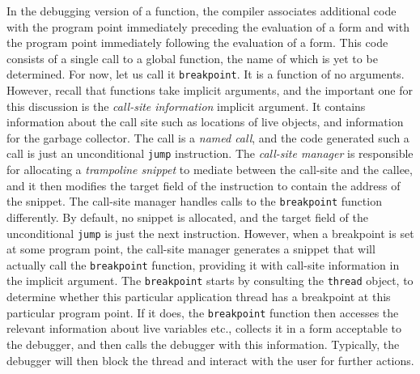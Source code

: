 In the debugging version of a function, the compiler associates
additional code with the program point immediately preceding the
evaluation of a form and with the program point immediately following
the evaluation of a form.  This code consists of a single call to a
global function, the name of which is yet to be determined.  For now,
let us call it \texttt{breakpoint}.  It is a function of no arguments.
However, recall that functions take implicit arguments, and the
important one for this discussion is the \emph{call-site information}
implicit argument.  It contains information about the call site such
as locations of live objects, and information for the garbage
collector.  The call is a \emph{named call}, and the code generated
such a call is just an unconditional \texttt{jump} instruction.  The
\emph{call-site manager} is responsible for allocating a
\emph{trampoline snippet} to mediate between the call-site and the
callee, and it then modifies the target field of the instruction to
contain the address of the snippet.  The call-site manager handles
calls to the \texttt{breakpoint} function differently.  By default, no
snippet is allocated, and the target field of the unconditional
\texttt{jump} is just the next instruction.  However, when a
breakpoint is set at some program point, the call-site manager
generates a snippet that will actually call the \texttt{breakpoint}
function, providing it with call-site information in the implicit
argument.  The \texttt{breakpoint} starts by consulting the
\texttt{thread} object, to determine whether this particular
application thread has a breakpoint at this particular program point.
If it does, the \texttt{breakpoint} function then accesses the
relevant information about live variables etc., collects it in a form
acceptable to the debugger, and then calls the debugger with this
information.  Typically, the debugger will then block the thread and
interact with the user for further actions.


